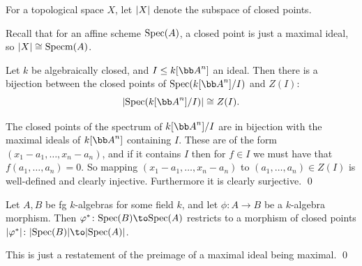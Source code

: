 \ethrm

\bdefn

    For a topological space $X$, let $\mathopen{}\mathclose{\left|X\right|}$ denote the subspace of closed points.

\edefn

Recall that for an affine scheme ${\rm Spec}(A)$, a closed point is just a maximal ideal, so $\mathopen{}\mathclose{\left|X\right|}\cong{\rm Specm}(A)$.

\bcoro

    Let $k$ be algebraically closed, and $I\leq k[\bA^n]$ an ideal.
    Then there is a bijection between the closed points of $\spec(k[\bA^n]/I)$ and $Z(I)$:
    $$ \abs{\spec(k[\bA^n]/I)} \cong Z(I) . $$

\ecoro

\bproof

    The closed points of the spectrum of $k[\bA^n]/I$ are in bijection with the maximal ideals of $k[\bA^n]$ containing $I$.
    These are of the form $(x_1-a_1,\dots,x_n-a_n)$, and if it contains $I$ then for $f\in I$ we must have that $f(a_1,\dots,a_n)=0$.
    So mapping $(x_1-a_1,\dots,x_n-a_n)$ to $(a_1,\dots,a_n)\in Z(I)$ is well-defined and clearly injective.
    Furthermore it is clearly surjective.
    \qed

\eproof

\bcoro

    Let $A,B$ be fg $k$-algebras for some field $k$, and let $\phi\colon A\to B$ be a $k$-algebra morphism.
    Then $\phi^*\colon\spec(B)\to\spec(A)$ restricts to a morphism of closed points $\abs{\phi^*}\colon\abs{\spec(B)}\to\abs{\spec(A)}$.

\ecoro

\bproof

    This is just a restatement of the preimage of a maximal ideal being maximal.
    \qed

\eproof


